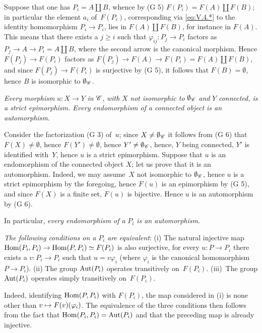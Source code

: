 \begin{enumerateb}
Suppose that one has $P_i=A \amalg B$, whence by (G 5)
$F(P_i)=F(A) \amalg F(B)$; in particular the element $a_i$
of~$F(P_i)$, corresponding via \eqref{eq:V.4.*} to
the identity homomorphism $P_i \to P_i$, lies in $F(A) \amalg
F(B)$, for instance in $F(A)$. This means that there exists a $j
\geq i$ such that $\varphi_{ij} \colon P_j \to P_i$ factors as
$P_j \to A \to P_i=A \amalg B$, where the second arrow
is the canonical morphism. Hence $F(P_j) \to F(P_i)$ factors
as $F(P_j) \to F(A) \to F(P_i)=F(A) \amalg F(B)$, and since $F(P_j)
\to F(P_i)$ is surjective by (G 5), it follows that
$F(B)=\emptyset$, hence $B$ is isomorphic to $\emptyset_{\cal{C}}$.

\item[e)]
\emph{Every morphism} $u \colon X \to Y$ \emph{in} $\cal{C}$,
\emph{with} $X$ \emph{not isomorphic to} $\emptyset_{\cal{C}}$
\emph{and} $Y$ \emph{connected, is a strict epimorphism. Every
endomorphism of a connected object is an automorphism}.

Consider the factorization (G 3) of~$u$; since $X \neq
\emptyset_{\cal{C}}$ it follows from (G 6) that $F(X) \neq \emptyset$, hence
$F(Y') \neq \emptyset$, hence $Y' \neq \emptyset_{\cal{C}}$, hence, $Y$
being connected, $Y'$ is identified with~$Y$, hence $u$ is a
strict epimorphism. Suppose that $u$ is an endomorphism of
the connected object $X$; let us prove that it is an automorphism. Indeed, we
may assume~$X$ not isomorphic to $\emptyset_{\cal{C}}$, hence $u$ is
a strict epimorphism by the foregoing, hence $F(u)$ is
an epimorphism by (G 5), and since $F(X)$ is a finite set,
$F(u)$ is bijective. Hence $u$ is an automorphism by (G 6).

In particular, \emph{every endomorphism of a} $P_i$ \emph{is an
automorphism}.

\item[f)] \emph{The following conditions on a} $P_i$ \emph{are
equivalent}: (i) The natural injective map
$\Hom(P_i,P_i) \to \Hom(P,P_i) \simeq F(P_i)$ is also surjective,
\ie for every $u \colon P \to P_i$ there exists a $v \colon P_i \to
P_i$ such that $u=v\varphi_i$ (where $\varphi_i$ is the canonical
homomorphism $P \to P_i$). (ii) The group $\operatorname{Aut}(P_i)$ operates transitively on~$F(P_i)$. (iii)~The group $\operatorname{Aut}(P_i)$ operates
simply transitively on~$F(P_i)$.

Indeed, identifying $\operatorname{Hom}(P,P_i)$ with $F(P_i)$, the map
considered in (i) is none other than $v \mto
F(v)(\varphi_i)$. The equivalence of the three conditions then follows
from the fact that $\operatorname{Hom}(P_i,P_i)=\operatorname{Aut}(P_i)$ and that the preceding
map is already injective.


\end{enumerateb}

